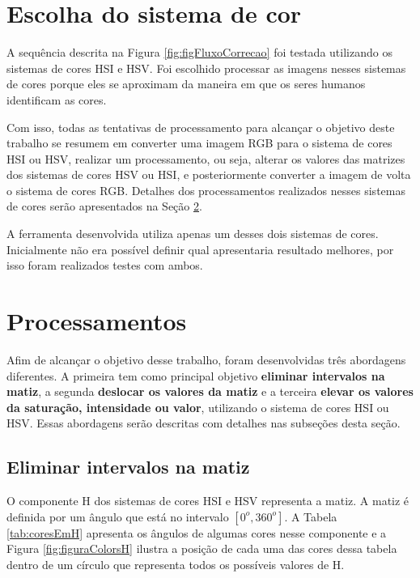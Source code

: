 \documentclass[	12pt, Times, openright, twoside, a4paper, english, brazil]{abntex2}
\begin{document}
\section{Escolha do sistema de cor}

A sequência descrita na Figura \ref{fig:figFluxoCorrecao} foi testada utilizando os sistemas de cores HSI e HSV. Foi escolhido processar as imagens nesses sistemas de cores porque eles se aproximam da maneira em que os seres humanos identificam as cores. 

Com isso, todas as tentativas de processamento para alcançar o objetivo deste trabalho se resumem em converter uma imagem RGB para o sistema de cores HSI ou HSV, realizar um processamento, ou seja, alterar os valores das matrizes dos sistemas de cores HSV ou HSI, e posteriormente converter a imagem de volta o sistema de cores RGB. Detalhes dos processamentos realizados nesses sistemas de cores serão apresentados na Seção \ref{sec:processamentoDasImagens}.

A ferramenta desenvolvida utiliza apenas um desses dois sistemas de cores. Inicialmente não era possível definir qual apresentaria resultado melhores, por isso foram realizados testes com ambos.

\section{Processamentos}
\label{sec:processamentoDasImagens}

Afim de alcançar o objetivo desse trabalho, foram desenvolvidas três abordagens diferentes. A primeira tem como principal objetivo \textbf{eliminar intervalos na matiz}, a segunda \textbf{deslocar os valores da matiz} e a terceira \textbf{elevar os valores da saturação, intensidade ou valor}, utilizando o sistema de cores HSI ou HSV. Essas abordagens serão descritas com detalhes nas subseções desta seção.

\subsection{Eliminar intervalos na matiz}
\label{subsec:eliminarIntervalosH}

O componente H dos sistemas de cores HSI e HSV representa a matiz. A matiz é definida por um ângulo que está no intervalo $[0^o,360^o]$. A Tabela \ref{tab:coresEmH} apresenta os ângulos de algumas cores nesse componente e a Figura \ref{fig:figuraColorsH} ilustra a posição de cada uma das cores dessa tabela dentro de um círculo que representa todos os possíveis valores de H.
\end{document}
